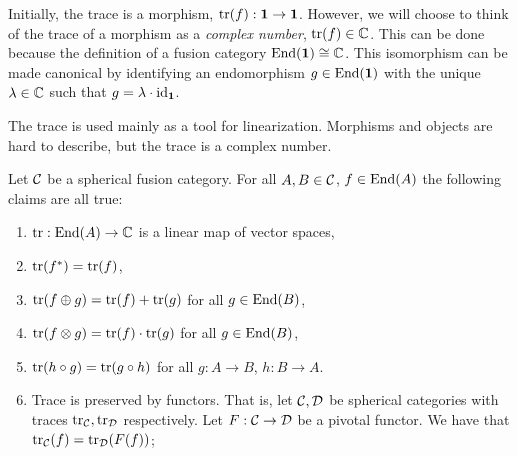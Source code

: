 Initially, the trace is a morphism,  $\operatorname{tr}(f):{\mathbf 1}\to{\mathbf 1}$. However, we will choose to think of the trace of a morphism as a {\em complex number}, $\operatorname{tr}(f)\in {\mathbb C}$. This can be done because the definition of a fusion category $\operatorname{End}({\mathbf 1})\cong {\mathbb C}$. This isomorphism can be made canonical by identifying an endomorphism $g\in \operatorname{End}({\mathbf 1})$ with the unique $\lambda\in {\mathbb C}$ such that $g = \lambda \cdot \operatorname{id}_{{\mathbf 1}}$.

\begin{rem}
The trace is used mainly as a tool for linearization. Morphisms and objects are hard to describe, but the trace is a complex number.
\end{rem}

\begin{prop}\label{trace-facts} Let ${\mathcal C}$ be a spherical fusion category. For all $A,B\in {\mathcal C}$, $f\in \operatorname{End}(A)$ the following claims are all true:

\begin{enumerate}
\item $\operatorname{tr}: \operatorname{End}(A)\to {\mathbb C}$ is a linear map of vector spaces,
\item $\operatorname{tr}(f^{*})=\operatorname{tr}(f)$,
\item $\operatorname{tr}(f\oplus g)=\operatorname{tr}(f)+\operatorname{tr}(g)$ for all $g\in \operatorname{End}(B)$,
\item $\operatorname{tr}(f\otimes g)=\operatorname{tr}(f)\cdot \operatorname{tr}(g)$ for all $g\in \operatorname{End}(B)$,
\item $\operatorname{tr}(h\circ g)=\operatorname{tr}(g\circ h)$ for all $g:A\to B$, $h:B\to A$.
\item Trace is preserved by functors. That is, let ${\mathcal C},{\mathcal D}$ be spherical categories with traces $\operatorname{tr}_{{\mathcal C}},\operatorname{tr}_{{\mathcal D}}$ respectively. Let $F:{\mathcal C}\to {\mathcal D}$ be a pivotal functor. We have that $\operatorname{tr}_{{\mathcal C}}(f)=\operatorname{tr}_{{\mathcal D}}(F(f))$;
\end{enumerate}

\end{prop}
